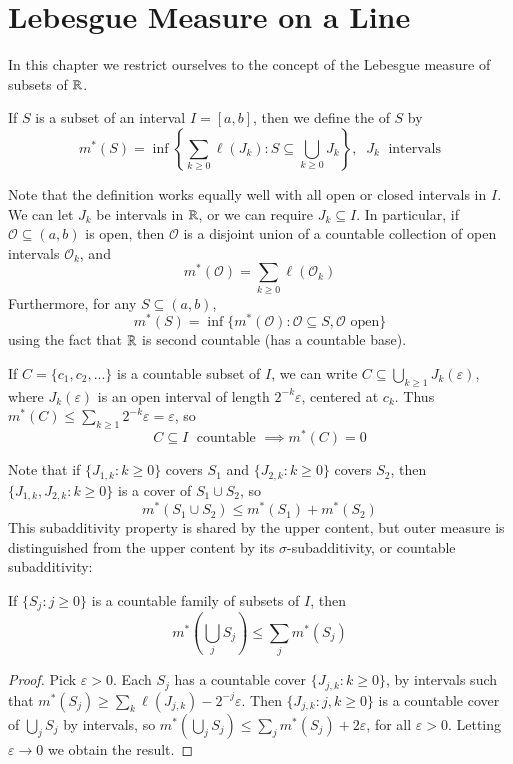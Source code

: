\chapter{Lebesgue Measure on a Line}\label{LebMeasure}


In this chapter we restrict ourselves to the concept of the Lebesgue measure of subsets of $\mathbb R$.

\begin{definition}
    If $S$ is a subset of an interval $I = [a,b]$, then we define the  of $S$ by $$m^*(S) = \inf\left\{\sum_{k\geq 0}\ell(J_k):S\subseteq \bigcup_{k\geq 0}J_k\right\},\;\;J_k\;\text{ intervals}$$
\end{definition}
Note that the definition works equally well with all open or closed intervals in $I$. We can let $J_k$ be intervals in $\mathbb R$, or we can require $J_k \subseteq I$. In particular, if $\mathcal{O} \subseteq (a,b)$ is open, then $\mathcal{O}$ is a disjoint union of a countable collection of open intervals $\mathcal{O}_k$, and $$m^*(\mathcal{O}) = \sum_{k\geq 0}\ell(\mathcal{O}_k)$$
Furthermore, for any $S \subseteq (a,b)$, $$m^*(S) = \inf\{m^*(\mathcal{O}):\mathcal{O}\subseteq S,\mathcal{O}\text{ open}\}$$
using the fact that $\mathbb R$ is second countable (has a countable base).

If $C = \{c_1,c_2,...\}$ is a countable subset of $I$, we can write $C \subseteq \bigcup_{k\geq 1}J_k(\varepsilon)$, where $J_k(\varepsilon)$ is an open interval of length $2^{-k}\varepsilon$, centered at $c_k$. Thus $m^*(C) \leq \sum_{k\geq 1}2^{-k}\varepsilon = \varepsilon$, so $$C \subseteq I\;\text{ countable }\implies m^*(C) = 0$$

Note that if $\{J_{1,k}:k\geq 0\}$ covers $S_1$ and $\{J_{2,k}:k\geq 0\}$ covers $S_2$, then $\{J_{1,k},J_{2,k}:k\geq 0\}$ is a cover of $S_1\cup S_2$, so $$m^*(S_1\cup S_2) \leq m^*(S_1) + m^*(S_2)$$
This subadditivity property is shared by the upper content, but outer measure is distinguished from the upper content by its $\sigma$-subadditivity, or countable subadditivity:

\begin{proposition}
    If $\{S_j:j\geq 0\}$ is a countable family of subsets of $I$, then $$m^*\left(\bigcup_jS_j\right) \leq \sum_jm^*(S_j)$$
\end{proposition}
\begin{proof}
    Pick $\varepsilon > 0$. Each $S_j$ has a countable cover $\{J_{j,k}:k\geq 0\}$, by intervals such that $m^*(S_j) \geq \sum_k\ell(J_{j,k}) -2^{-j}\varepsilon$. Then $\{J_{j,k}:j,k\geq 0\}$ is a countable cover of $\bigcup_jS_j$ by intervals, so $m^*\left(\bigcup_jS_j\right) \leq \sum_jm^*(S_j) + 2\varepsilon$, for all $\varepsilon > 0$. Letting $\varepsilon\rightarrow 0$ we obtain the result.
\end{proof}


